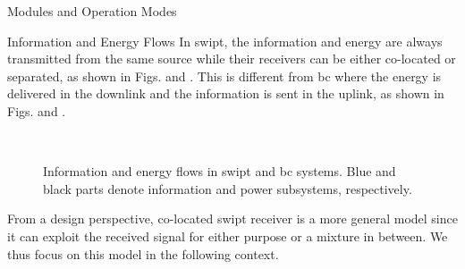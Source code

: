 \begin{section}{}
	\begin{subsection}{Modules and Operation Modes}
		\begin{subsubsection}{Information and Energy Flows}
			In \gls{swipt}, the information and energy are always transmitted from the same source while their receivers can be either co-located or separated, as shown in Figs.  and .
			This is different from \gls{bc} where the energy is delivered in the downlink and the information is sent in the uplink, as shown in Figs.  and .
			\begin{figure}[H]
				\centering
				\\
				\caption{
					Information and energy flows in \gls{swipt} and \gls{bc} systems. Blue and black parts denote information and power subsystems, respectively.
				}
				\label{fg:wipt_schemes}
			\end{figure}
			From a design perspective, co-located \gls{swipt} receiver is a more general model since it can exploit the received signal for either purpose or a mixture in between.
			We thus focus on this model in the following context.
		\end{subsubsection}


\end{subsection}
\end{section}
